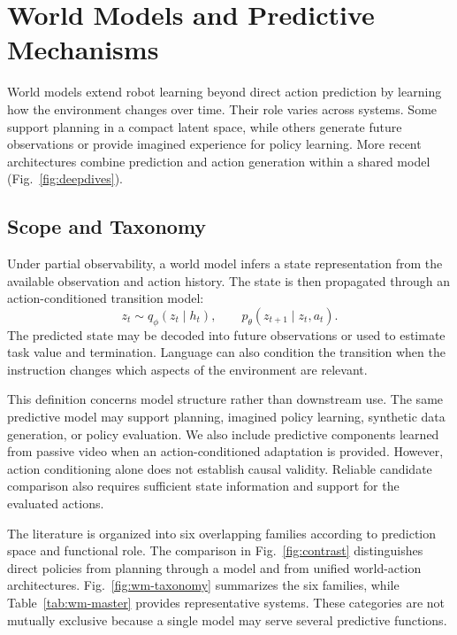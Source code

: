 \documentclass{ieeeaccess}
\begin{document}
\section{World Models and Predictive Mechanisms}
\label{sec:wm}

World models extend robot learning beyond direct action prediction by learning how the environment changes over time. Their role varies across systems. Some support planning in a compact latent space, while others generate future observations or provide imagined experience for policy learning. More recent architectures combine prediction and action generation within a shared model (Fig.~\ref{fig:deepdives}).

\subsection{Scope and Taxonomy}
\label{sec:wmdef}

Under partial observability, a world model infers a state representation from the available observation and action history. The state is then propagated through an action-conditioned transition model:
\begin{equation}
z_t \sim q_\phi(z_t \mid h_t),
\qquad
p_\theta(z_{t+1} \mid z_t,a_t).
\end{equation}
The predicted state may be decoded into future observations or used to estimate task value and termination. Language can also condition the transition when the instruction changes which aspects of the environment are relevant.

This definition concerns model structure rather than downstream use. The same predictive model may support planning, imagined policy learning, synthetic data generation, or policy evaluation. We also include predictive components learned from passive video when an action-conditioned adaptation is provided. However, action conditioning alone does not establish causal validity. Reliable candidate comparison also requires sufficient state information and support for the evaluated actions.

The literature is organized into six overlapping families according to prediction space and functional role. The comparison in Fig.~\ref{fig:contrast} distinguishes direct policies from planning through a model and from unified world-action architectures. Fig.~\ref{fig:wm-taxonomy} summarizes the six families, while Table~\ref{tab:wm-master} provides representative systems. These categories are not mutually exclusive because a single model may serve several predictive functions.
\end{document}
